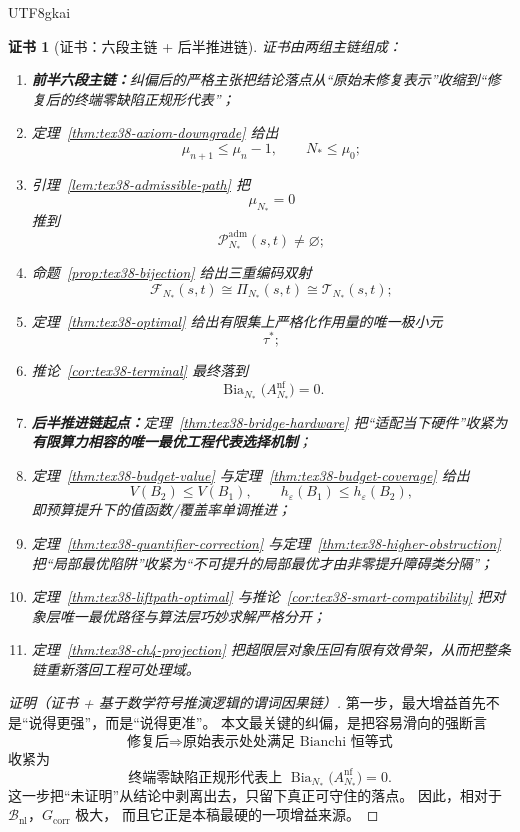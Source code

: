 \documentclass[12pt]{article}
\newtheorem{Certificate}{证书}[section]
\newcommand{\Bia}{\operatorname{Bia}}
\begin{document}
\begin{CJK*}{UTF8}{gkai}
\begin{Certificate}[证书：六段主链 + 后半推进链]
\label{cert:tex38-gain-total}
证书由两组主链组成：
\begin{enumerate}
  \item \textbf{前半六段主链：}纠偏后的严格主张把结论落点从“原始未修复表示”收缩到“修复后的终端零缺陷正规形代表”；
  \item 定理~\ref{thm:tex38-axiom-downgrade} 给出
  \[
    \mu_{n+1}\le \mu_n-1,
    \qquad
    N_\ast\le \mu_0;
  \]
  \item 引理~\ref{lem:tex38-admissible-path} 把
  \[
    \mu_{N_\ast}=0
  \]
  推到
  \[
    \mathcal{P}^{\mathrm{adm}}_{N_\ast}(s,t)\neq\varnothing;
  \]
  \item 命题~\ref{prop:tex38-bijection} 给出三重编码双射
  \[
    \mathcal{F}_{N_\ast}(s,t)
    \cong
    \Pi_{N_\ast}(s,t)
    \cong
    \mathcal{T}_{N_\ast}(s,t);
  \]
  \item 定理~\ref{thm:tex38-optimal} 给出有限集上严格化作用量的唯一极小元
  \[
    \tau^\ast;
  \]
  \item 推论~\ref{cor:tex38-terminal} 最终落到
  \[
    \Bia_{N_\ast}\bigl(A_{N_\ast}^{\mathrm{nf}}\bigr)=0.
  \]
  \item \textbf{后半推进链起点：}定理~\ref{thm:tex38-bridge-hardware} 把“适配当下硬件”收紧为\textbf{有限算力相容的唯一最优工程代表选择机制}；
  \item 定理~\ref{thm:tex38-budget-value} 与定理~\ref{thm:tex38-budget-coverage} 给出
  \[
    V(B_2)\le V(B_1),
    \qquad
    h_\varepsilon(B_1)\le h_\varepsilon(B_2),
  \]
  即预算提升下的值函数/覆盖率单调推进；
  \item 定理~\ref{thm:tex38-quantifier-correction} 与定理~\ref{thm:tex38-higher-obstruction}
    把“局部最优陷阱”收紧为“不可提升的局部最优才由非零提升障碍类分隔”；
  \item 定理~\ref{thm:tex38-liftpath-optimal} 与推论~\ref{cor:tex38-smart-compatibility} 把对象层唯一最优路径与算法层巧妙求解严格分开；
  \item 定理~\ref{thm:tex38-ch4-projection} 把超限层对象压回有限有效骨架，从而把整条链重新落回工程可处理域。
\end{enumerate}
\end{Certificate}

\begin{proof}[证明（证书 + 基于数学符号推演逻辑的谓词因果链）]
第一步，最大增益首先不是“说得更强”，而是“说得更准”。
本文最关键的纠偏，是把容易滑向的强断言
\[
  \text{修复后}
  \Longrightarrow
  \text{原始表示处处满足 Bianchi 恒等式}
\]
收紧为
\[
  \text{终端零缺陷正规形代表上 }
  \Bia_{N_\ast}\bigl(A_{N_\ast}^{\mathrm{nf}}\bigr)=0.
\]
这一步把“未证明”从结论中剥离出去，只留下真正可守住的落点。
因此，相对于 $\mathcal{B}_{\mathrm{nl}}$，$G_{\mathrm{corr}}$ 极大，
而且它正是本稿最硬的一项增益来源。


\end{proof}
\end{CJK*}
\end{document}
